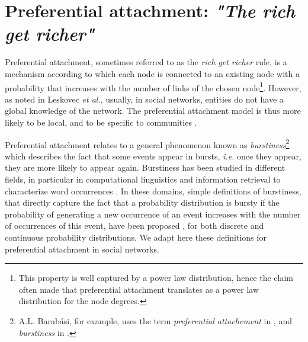 \section{Preferential attachment: \emph{"The rich get richer"}}
\label{sec:burstiness}

Preferential attachment, sometimes referred to as the \textit{rich get richer} rule, is a mechanism according to which each node is connected to an existing node with a probability that increases with the number of links of the chosen node\footnote{This property is well captured by a power law distribution, hence the claim often made that preferential attachment translates as a power law distribution for the node degrees.}. However, as noted in Leskovec \textit{et al.}, usually, in social networks, entities do not have a global knowledge of the network. The preferential attachment model is thus more likely to be local, and to be specific to communities \cite{LeskovecBKT08}.

Preferential attachment relates to a general phenomenon known as \textit{burstiness}\footnote{A.L. Barab\'asi, for example, uses the term \textit{preferential attachement} in \cite{barabasi1999emergence}, and \textit{burstiness} in \cite{barabasi_burst}.} which describes the fact that some events appear in bursts, \textit{i.e.} once they appear, they are more likely to appear again. Burstiness has been studied in different fields, in particular in computational linguistics and information retrieval to characterize word occurrences \cite{church1995poisson}. In these domains, simple definitions of burstiness, that directly capture the fact that a probability distribution is bursty if the probability of generating a new occurrence of an event increases with the number of occurrences of this event, have been proposed \cite{clinchant2008bnb,clinchant2010information}, for both discrete and continuous probability distributions. We adapt here these definitions for preferential attachment in social networks.

